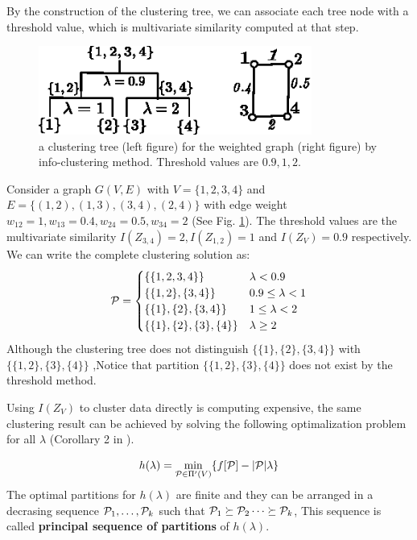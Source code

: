 \documentclass{article}
\begin{document}
By the construction of the clustering tree, we can associate each tree node with a threshold value, which is multivariate similarity computed at that step.
\begin{example}
\begin{figure}
\centering
\includegraphics[width=0.8\textwidth]{pic/threshold.eps}
\caption{a clustering tree (left figure) for the weighted graph (right figure) by info-clustering method. Threshold values are $0.9, 1, 2$.}\label{fig:threshold}
\end{figure}
Consider a graph $G(V, E)$ with $V=\{1,2,3,4\}$ and $E=\{(1,2),(1,3),(3,4),(2,4)\}$ with edge weight $w_{12}=1,w_{13}=0.4,w_{24}=0.5,w_{34}=2$ (See Fig. \ref{fig:threshold}). The threshold values are the multivariate similarity $I(Z_{3,4})=2, I(Z_{1,2})=1$ and $I(Z_V)=0.9$ respectively. We can write the complete clustering solution as:
\begin{equation*}
\P = 
\begin{cases}
\{\{1,2,3,4\}\} & \lambda < 0.9 \\
\{\{1,2\},\{3,4\}\} & 0.9 \leq \lambda < 1 \\
\{\{1\},\{2\},\{3,4\}\} & 1 \leq \lambda < 2\\
\{\{1\},\{2\},\{3\},\{4\}\} & \lambda \geq 2
\end{cases}
\end{equation*}
Although the clustering tree does not distinguish $\{\{1\},\{2\},\{3,4\}\}$ with $\{\{1,2\},\{3\}, \{4\}\}$ ,Notice that partition $\{\{1,2\},\{3\}, \{4\}\}$ does not exist by the threshold method.
\end{example}
Using $I(Z_V)$ to cluster data directly is computing expensive, the same clustering result can be achieved by solving the following optimalization problem for all $\lambda$ (Corollary 2 in \cite{RN1}).
\begin{proposition}\label{prop:psp}
\begin{equation}\label{eq:hL}
h(\lambda) = \min_{\P \in \Pi'(V)}\{ f[\P] - \abs{\P} \lambda \}
\end{equation}
The optimal partitions for $h(\lambda)$ are finite and they can be arranged in a decrasing sequence $\P_1, \dots, \P_k$ such that $\P_1 \succeq \P_2 \dots \succeq \P_k$, This sequence is called \textbf{principal sequence of partitions} of $h(\lambda)$\cite{RN17}.
\end{proposition}
\end{document}
